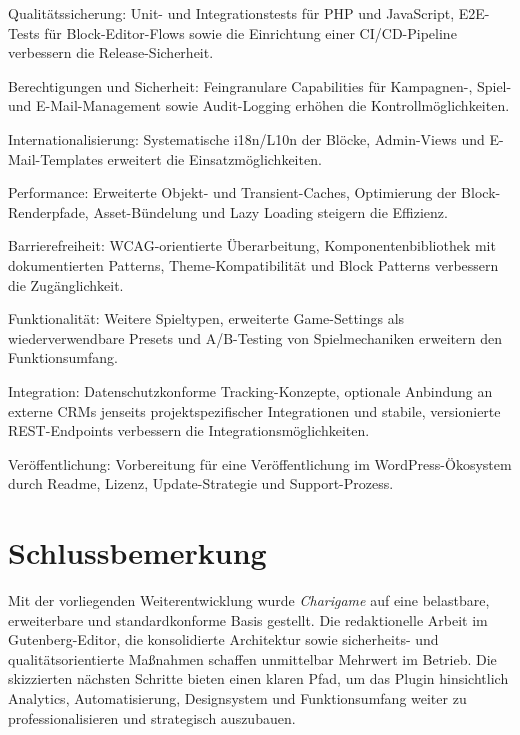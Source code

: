 Qualitätssicherung: Unit- und Integrationstests für PHP und JavaScript, E2E-Tests für Block-Editor-Flows sowie die Einrichtung einer CI/CD-Pipeline verbessern die Release-Sicherheit.

Berechtigungen und Sicherheit: Feingranulare Capabilities für Kampagnen-, Spiel- und E-Mail-Management sowie Audit-Logging erhöhen die Kontrollmöglichkeiten.

Internationalisierung: Systematische i18n/L10n der Blöcke, Admin-Views und E-Mail-Templates erweitert die Einsatzmöglichkeiten.

Performance: Erweiterte Objekt- und Transient-Caches, Optimierung der Block-Renderpfade, Asset-Bündelung und Lazy Loading steigern die Effizienz.

Barrierefreiheit: WCAG-orientierte Überarbeitung, Komponentenbibliothek mit dokumentierten Patterns, Theme-Kompatibilität und Block Patterns verbessern die Zugänglichkeit.

Funktionalität: Weitere Spieltypen, erweiterte Game-Settings als wiederverwendbare Presets und A/B-Testing von Spielmechaniken erweitern den Funktionsumfang.

Integration: Datenschutzkonforme Tracking-Konzepte, optionale Anbindung an externe CRMs jenseits projektspezifischer Integrationen und stabile, versionierte REST-Endpoints verbessern die Integrationsmöglichkeiten.

Veröffentlichung: Vorbereitung für eine Veröffentlichung im WordPress-Ökosystem durch Readme, Lizenz, Update-Strategie und Support-Prozess.

\section{Schlussbemerkung}
Mit der vorliegenden Weiterentwicklung wurde \textit{Charigame} auf eine belastbare, erweiterbare und standardkonforme Basis gestellt.
Die redaktionelle Arbeit im Gutenberg-Editor, die konsolidierte Architektur sowie sicherheits- und qualitätsorientierte Maßnahmen schaffen unmittelbar Mehrwert im Betrieb.
Die skizzierten nächsten Schritte bieten einen klaren Pfad, um das Plugin hinsichtlich Analytics, Automatisierung, Designsystem und Funktionsumfang weiter zu professionalisieren und strategisch auszubauen.

